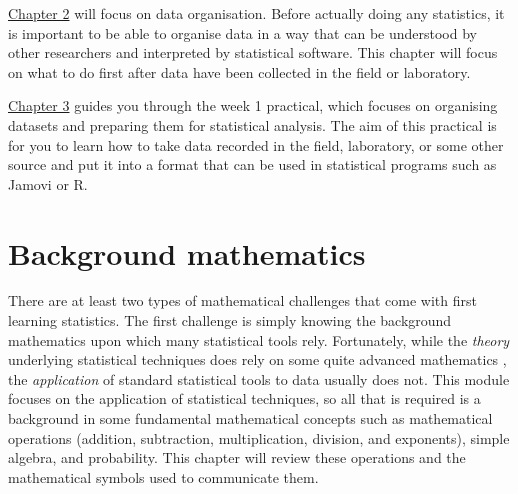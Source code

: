 \documentclass[
]{scrbook}
\begin{document}
\protect\hyperlink{Chapter_2}{Chapter 2} will focus on data organisation.
Before actually doing any statistics, it is important to be able to organise data in a way that can be understood by other researchers and interpreted by statistical software.
This chapter will focus on what to do first after data have been collected in the field or laboratory.

\protect\hyperlink{Chapter_3}{Chapter 3} guides you through the week 1 practical, which focuses on organising datasets and preparing them for statistical analysis.
The aim of this practical is for you to learn how to take data recorded in the field, laboratory, or some other source and put it into a format that can be used in statistical programs such as Jamovi or R.

\hypertarget{Chapter_1}{%
\chapter{Background mathematics}\label{Chapter_1}}

There are at least two types of mathematical challenges that come with first learning statistics.
The first challenge is simply knowing the background mathematics upon which many statistical tools rely.
Fortunately, while the \emph{theory} underlying statistical techniques does rely on some quite advanced mathematics \citep[e.g., see][]{Mclean1991, Rencher2000, Miller2004}, the \emph{application} of standard statistical tools to data usually does not.
This module focuses on the application of statistical techniques, so all that is required is a background in some fundamental mathematical concepts such as mathematical operations (addition, subtraction, multiplication, division, and exponents), simple algebra, and probability.
This chapter will review these operations and the mathematical symbols used to communicate them.
\end{document}
